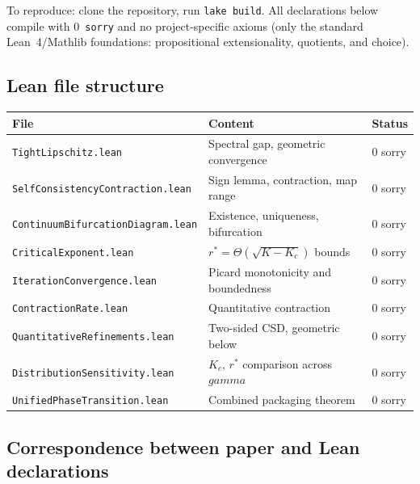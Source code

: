 \documentclass[11pt,a4paper]{article}
\let\gamma\relax\def\gamma{gamma}%
\theoremstyle{definition}
\begin{document}
\noindent To reproduce: clone the repository, run \texttt{lake build}. All declarations below compile with 0~\texttt{sorry} and no project-specific axioms (only the standard Lean~4/Mathlib foundations: propositional extensionality, quotients, and choice).

\subsection{Lean file structure}

\begin{center}
\begin{tabular}{lll}
\toprule
\textbf{File} & \textbf{Content} & \textbf{Status} \\
\midrule
\texttt{TightLipschitz.lean} & Spectral gap, geometric convergence & 0 sorry \\
\texttt{SelfConsistencyContraction.lean} & Sign lemma, contraction, map range & 0 sorry \\
\texttt{ContinuumBifurcationDiagram.lean} & Existence, uniqueness, bifurcation & 0 sorry \\
\texttt{CriticalExponent.lean} & $r^* = \Theta(\sqrt{K-K_c})$ bounds & 0 sorry \\
\texttt{IterationConvergence.lean} & Picard monotonicity and boundedness & 0 sorry \\
\texttt{ContractionRate.lean} & Quantitative contraction & 0 sorry \\
\texttt{QuantitativeRefinements.lean} & Two-sided CSD, geometric below & 0 sorry \\
\texttt{DistributionSensitivity.lean} & $K_c$, $r^*$ comparison across $\gamma$ & 0 sorry \\
\texttt{UnifiedPhaseTransition.lean} & Combined packaging theorem & 0 sorry \\
\bottomrule
\end{tabular}
\end{center}

\subsection{Correspondence between paper and Lean declarations}
\end{document}
